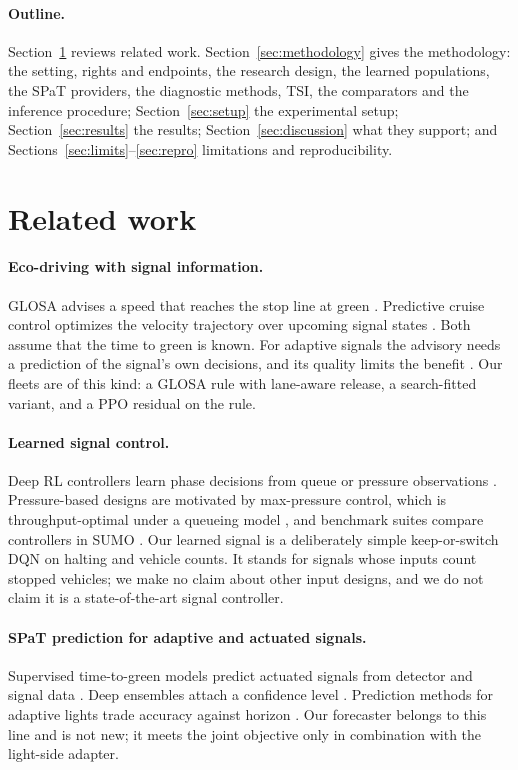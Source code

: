 \documentclass[11pt]{article}
\begin{document}
\paragraph{Outline.} Section~\ref{sec:related} reviews related work. Section~\ref{sec:methodology} gives the methodology: the setting, rights and
endpoints, the research design, the learned populations, the SPaT providers, the diagnostic methods, TSI, the comparators and the
inference procedure; Section~\ref{sec:setup} the experimental setup; Section~\ref{sec:results} the results;
Section~\ref{sec:discussion} what they support; and Sections~\ref{sec:limits}--\ref{sec:repro} limitations and reproducibility.

\section{Related work}\label{sec:related}
\paragraph{Eco-driving with signal information.} GLOSA advises a speed that reaches the stop line at green
\cite{katsaros2011}. Predictive cruise control optimizes the velocity trajectory over upcoming signal states \cite{asadi2011}. Both assume
that the time to green is known. For adaptive signals the advisory needs a prediction of the signal's own decisions, and its quality limits
the benefit \cite{bodenheimer2014}. Our fleets are of this kind: a GLOSA rule with lane-aware release, a search-fitted variant, and a PPO
residual on the rule.
\paragraph{Learned signal control.} Deep RL controllers learn phase decisions from queue or pressure observations \cite{wei2018,wei2019}.
Pressure-based designs are motivated by max-pressure control, which is throughput-optimal under a queueing model \cite{varaiya2013}, and
benchmark suites compare controllers in SUMO \cite{ault2021}. Our learned signal is a deliberately simple keep-or-switch DQN on halting and
vehicle counts. It stands for signals whose inputs count stopped vehicles; we make no claim about other input designs, and we do not claim
it is a state-of-the-art signal controller.
\paragraph{SPaT prediction for adaptive and actuated signals.} Supervised time-to-green models predict actuated signals from detector and
signal data \cite{genser2024}. Deep ensembles attach a confidence level \cite{eteifa2025}. Prediction methods for adaptive lights trade
accuracy against horizon \cite{bodenheimer2014}. Our forecaster belongs to this line and is not new; it meets the joint objective only in
combination with the light-side adapter.
\end{document}
